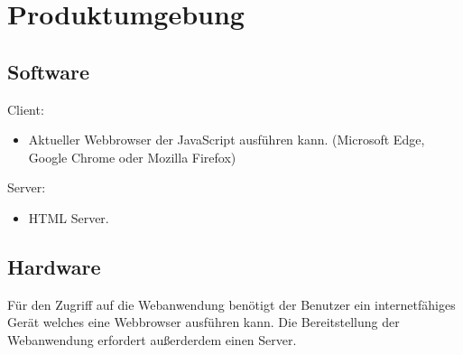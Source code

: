 \section{Produktumgebung}

\subsection{Software}

Client:
\begin{itemize}
    \item Aktueller \gls{Webbrowser} der JavaScript ausführen kann. (Microsoft Edge, Google Chrome oder Mozilla Firefox)
\end{itemize}
Server:
\begin{itemize}
    \item HTML Server.
\end{itemize}

\subsection{Hardware}

Für den Zugriff auf die \gls{Webanwendung} benötigt der Benutzer ein internetfähiges Gerät welches eine \gls{Webbrowser} ausführen kann.  
Die Bereitstellung der \gls{Webanwendung} erfordert außerderdem einen Server.